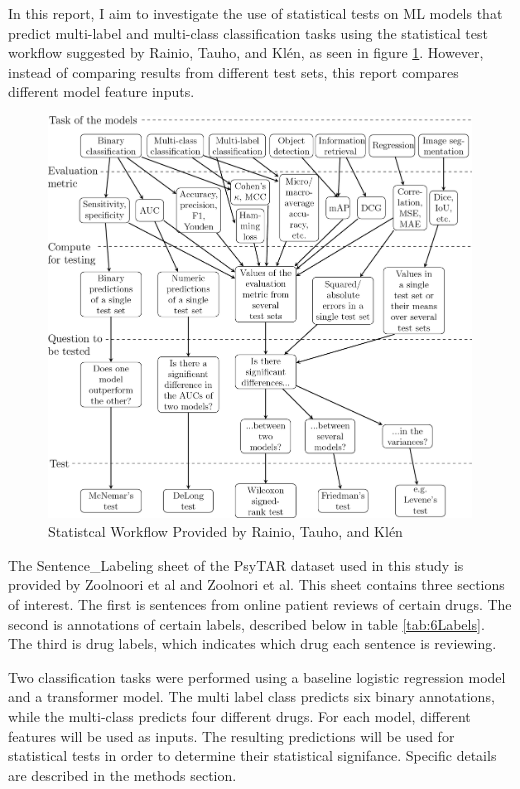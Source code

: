 \documentclass[10.7pt, twocolumn]{article}
\begin{document}
In this report, I aim to investigate the use of statistical tests on ML models that predict multi-label and multi-class  classification tasks using the statistical test workflow suggested by Rainio, Tauho, and Klén\cite{statsBased}, as seen in figure \ref{fig:statistical test workflow}. However, instead of comparing results from different test sets, this report compares different model feature inputs.

\begin{figure}[H]
  \centering
  \includegraphics[totalheight=8cm]{images/41598_2024_56706_Fig3_HTML.png}
  \caption{Statistcal Workflow Provided by Rainio, Tauho, and Klén\cite{statsBased}}
  \label{fig:statistical test workflow}
\end{figure}
 
The Sentence\_Labeling sheet of the PsyTAR dataset used in this study is provided by Zoolnoori et al\cite{psyTAR1} and Zoolnori et al\cite{psyTar2}. This sheet contains three sections of interest. The first is sentences from online patient reviews of certain drugs. The second is annotations of certain labels, described below in table \ref{tab:6Labels}. The third is drug labels, which indicates which drug each sentence is reviewing.

Two classification tasks were performed using a baseline logistic regression model and a transformer model. The multi label class predicts six binary annotations, while the multi-class predicts four different drugs. For each model, different features will be used as inputs. The resulting predictions will be used for statistical tests in order to determine their statistical signifance. Specific details are described in the methods section.
\end{document}
